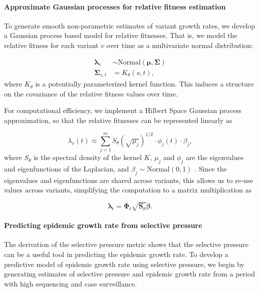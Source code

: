 \documentclass[12pt,oneside,letterpaper]{article}
\renewcommand{\vec}[1]{\boldsymbol{#1}}
\begin{document}
\paragraph{Approximate Gaussian processes for relative fitness estimation}%

To generate smooth non-parametric estimates of variant growth rates, we develop a Gaussian process based model for relative fitnesses.
That is, we model the relative fitness for each variant $v$ over time as a multivariate normal distribution:

\begin{align*}
    \vec{\lambda}_{v} &\sim \text{Normal}(\vec{\mu}, \vec{\Sigma})\\
    \vec{\Sigma}_{s, t} &= K_{\theta}(s, t),
\end{align*}
where $K_{\theta}$ is a potentially parameterized kernel function.
This induces a structure on the covariance of the relative fitness values over time.

For computational efficiency, we implement a Hilbert Space Gaussian process approximation, so that the relative fitnesses can be represented linearly as

\begin{equation}
    \lambda_{v}(t) \approx \sum_{j=1}^{m} S_{\theta}(\sqrt{\mu_{j}})^{1/2} \cdot \phi_{j}(t) \cdot \beta_{j},
\end{equation}
where $S_{\theta}$ is the spectral density of the kernel $K$, $\mu_{j}$ and $\phi_{j}$ are the eigenvalues and eigenfunctions of the Laplacian, and $\beta_{j} \sim \text{Normal}(0,1)$ \cite{riutortmayol2022practical}.
Since the eigenvalues and eigenfunctions are shared across variants, this allows us to re-use values across variants, simplifying the computation to a matrix multiplication as

\begin{equation*}
    \vec{\lambda}_{t} = \vec{\Phi}_{t} \sqrt{\vec{S}_{\theta}}\vec{\beta}.
\end{equation*}

\paragraph{Predicting epidemic growth rate from selective pressure}%

The derivation of the selective pressure metric shows that the selective pressure can be a useful tool in predicting the epidemic growth rate.
To develop a predictive model of epidemic growth rate using selective pressure, we begin by generating estimates of selective pressure and epidemic growth rate from a period with high sequencing and case surveillance.
\end{document}
